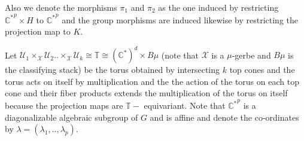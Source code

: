 \documentclass[10pt]{amsart}
\newcommand{\sX}{{\mathcal X}}
\numberwithin{equation}{subsection}
\begin{document}
Also we denote the morphisms $\pi_1$ and $\pi_2$ as the one induced by restricting $\mathbb{C^*}^{p}\times H$ to $\mathbb{C^*}^{p}$ and the group morphisms are induced likewise by restricting the projection map to $K.$
\par
Let $\mathscr{U}_1\times_{\sX}\mathscr{U}_2..\times_{\sX} \mathscr{U}_{k} \cong \mathbb{T}\cong (\mathbb{C^*})^d\times B\mu$ (note that $\sX$ is a $\mu$-gerbe and $B\mu$ is the classifying stack) be the torus obtained by intersecting $k$ top cones and the torus acts on itself by multiplication and the the action of the torus on each top cone and their fiber products extends the multiplication of the torus on itself because the projection maps are $\mathbb{T}-$ equivariant. Note that $\mathbb{C^*}^{p}$ is a diagonalizable algebraic subgroup of $G$ and is affine and denote the co-ordinates by $\lambda=(\lambda_1,..,\lambda_p).$\newline
\end{document}
